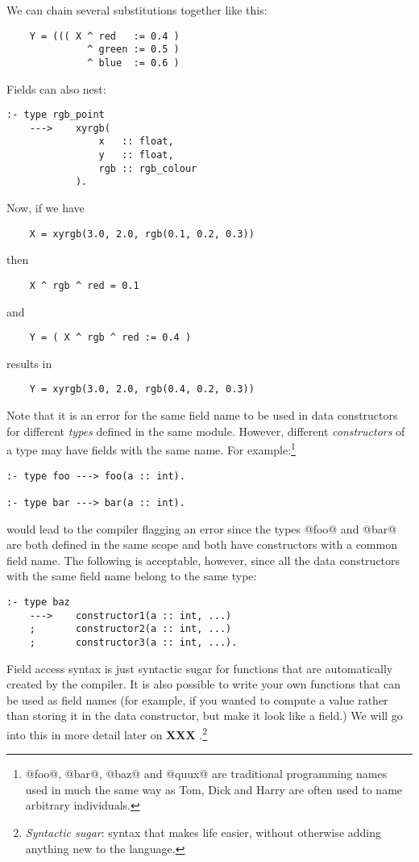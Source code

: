 \documentclass[a4paper,11pt,notitlepage,onecolumn]{article}
\newcommand{\XXX}[1]%
{{\small\textbf{XXX} \emph{#1}}}
\begin{document}
We can chain several substitutions together like this:
\begin{verbatim}
    Y = ((( X ^ red   := 0.4 )
              ^ green := 0.5 )
              ^ blue  := 0.6 )
\end{verbatim}
Fields can also nest:
\begin{verbatim}
:- type rgb_point
    --->    xyrgb(
                x   :: float,
                y   :: float,
                rgb :: rgb_colour
            ).
\end{verbatim}
Now, if we have
\begin{verbatim}
    X = xyrgb(3.0, 2.0, rgb(0.1, 0.2, 0.3))
\end{verbatim}
then
\begin{verbatim}
    X ^ rgb ^ red = 0.1
\end{verbatim}
and
\begin{verbatim}
    Y = ( X ^ rgb ^ red := 0.4 )
\end{verbatim}
results in
\begin{verbatim}
    Y = xyrgb(3.0, 2.0, rgb(0.4, 0.2, 0.3))
\end{verbatim}
Note that it is an error for the same field name to be used in
data constructors for different \emph{types} defined in the same
module.  However, different \emph{constructors} of a type may have
fields with the same name.  For example:\footnote{@foo@, @bar@, @baz@ and @quux@ are traditional programming
names used in much the same way as Tom, Dick and Harry are often
used to name arbitrary individuals.}
\begin{verbatim}
:- type foo ---> foo(a :: int).

:- type bar ---> bar(a :: int).
\end{verbatim}
would lead to the compiler flagging an error since the types
@foo@ and @bar@ are both defined in the same scope and both have
constructors with a common field name.  The following is
acceptable, however, since all the data constructors with the
same field name belong to the same type:
\begin{verbatim}
:- type baz
    --->    constructor1(a :: int, ...)
    ;       constructor2(a :: int, ...)
    ;       constructor3(a :: int, ...).
\end{verbatim}
Field access syntax is just syntactic sugar for functions that
are automatically created by the compiler.  It is also
possible to write your own functions that can be used as field
names (for example, if you wanted to compute a value rather
than storing it in the data constructor, but make it look like
a field.)  We will go into this in more detail later on \XXX{}.\footnote{\emph{Syntactic sugar}: syntax that makes life easier,
without otherwise adding anything new to the language.}
\end{document}
